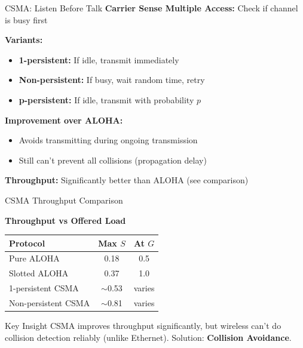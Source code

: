 \documentclass[aspectratio=169,11pt]{beamer}
\begin{document}
\begin{frame}{CSMA: Listen Before Talk}
    \textbf{Carrier Sense Multiple Access:} Check if channel is busy first
    
    \vspace{0.3cm}
    \textbf{Variants:}
    \begin{itemize}
        \item \textbf{1-persistent:} If idle, transmit immediately
        \item \textbf{Non-persistent:} If busy, wait random time, retry
        \item \textbf{p-persistent:} If idle, transmit with probability $p$
    \end{itemize}
    
    \vspace{0.3cm}
    \textbf{Improvement over ALOHA:}
    \begin{itemize}
        \item Avoids transmitting during ongoing transmission
        \item Still can't prevent all collisions (propagation delay)
    \end{itemize}
    
    \textbf{Throughput:} Significantly better than ALOHA (see comparison)
\end{frame}

\begin{frame}{CSMA Throughput Comparison}
    \begin{center}
        \textbf{Throughput vs Offered Load}
    \end{center}
    
    \begin{table}
        \centering
        \begin{tabular}{@{}lcc@{}}
            \toprule
            \textbf{Protocol} & \textbf{Max $S$} & \textbf{At $G$} \\
            \midrule
            Pure ALOHA & 0.18 & 0.5 \\
            Slotted ALOHA & 0.37 & 1.0 \\
            1-persistent CSMA & $\sim$0.53 & varies \\
            Non-persistent CSMA & $\sim$0.81 & varies \\
            \bottomrule
        \end{tabular}
    \end{table}
    
    \begin{block}{Key Insight}
        CSMA improves throughput significantly, but wireless can't do collision detection reliably (unlike Ethernet). Solution: \textbf{Collision Avoidance}.
    \end{block}
\end{frame}
\end{document}
